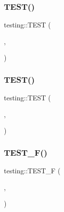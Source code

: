 \subsubsection{\texorpdfstring{TEST()}{TEST()}\hspace{0.1cm}{\footnotesize\ttfamily [6/7]}}
{\footnotesize\ttfamily testing\+::\+T\+E\+ST (\begin{DoxyParamCaption}\item[{Successful\+Assertion\+Test}]{,  }\item[{A\+S\+S\+E\+R\+T\+\_\+\+S\+TR}]{ }\end{DoxyParamCaption})}

\mbox{\label{namespacetesting_af597d0ad4de0197141b78e9c1035e491}} 
\subsubsection{\texorpdfstring{TEST()}{TEST()}\hspace{0.1cm}{\footnotesize\ttfamily [7/7]}}
{\footnotesize\ttfamily testing\+::\+T\+E\+ST (\begin{DoxyParamCaption}\item[{Code\+Location\+For\+T\+E\+ST}]{,  }\item[{Verify}]{ }\end{DoxyParamCaption})}

\mbox{\label{namespacetesting_acd53db89097aba1468724d6446069b1e}} 
\subsubsection{\texorpdfstring{TEST\_F()}{TEST\_F()}\hspace{0.1cm}{\footnotesize\ttfamily [1/52]}}
{\footnotesize\ttfamily testing\+::\+T\+E\+S\+T\+\_\+F (\begin{DoxyParamCaption}\item[{\mbox{\hyperlink{classtesting_1_1_test_info_test}{Test\+Info\+Test}}}]{,  }\item[{Names}]{ }\end{DoxyParamCaption})}

\mbox{\label{namespacetesting_ab00e29c00b3e29cdfa21d23b79dd3776}} 
